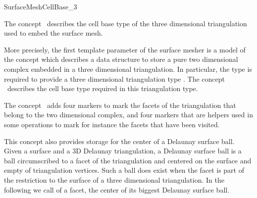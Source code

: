 

\begin{ccRefConcept}{SurfaceMeshCellBase_3}


\ccDefinition
The concept \ccRefName\ describes the cell base type
of the three dimensional triangulation used
to embed the surface mesh.  

More precisely,
the first template parameter  of the surface mesher
is a model of the concept 
which describes a data structure to store
a pure two dimensional complex 
embedded in a three dimensional triangulation.
In particular, the type  is required to provide
a three dimensional triangulation type
. 
The concept \ccRefName\ describes the cell base type
required in this triangulation type.

\ccGeneralizes
{}

The concept \ccRefName\ adds four markers to mark the facets
of the triangulation that belong to the two dimensional complex,
and four markers  that are helpers 
used in some operations to mark for instance
the facets that have been visited.

This concept also provides storage for  the center of a Delaunay surface
ball. 
Given a surface and a 3D  Delaunay triangulation,
 a Delaunay surface ball
is a ball circumscribed to a facet of the triangulation
and centered on the surface and empty of triangulation vertices. 
Such a ball does exist
when the facet is part of the restriction to the surface
of a three dimensional triangulation.
 In the following we call 
of a facet, the center of its biggest Delaunay surface ball.

\ccTypes



\end{ccRefConcept}
